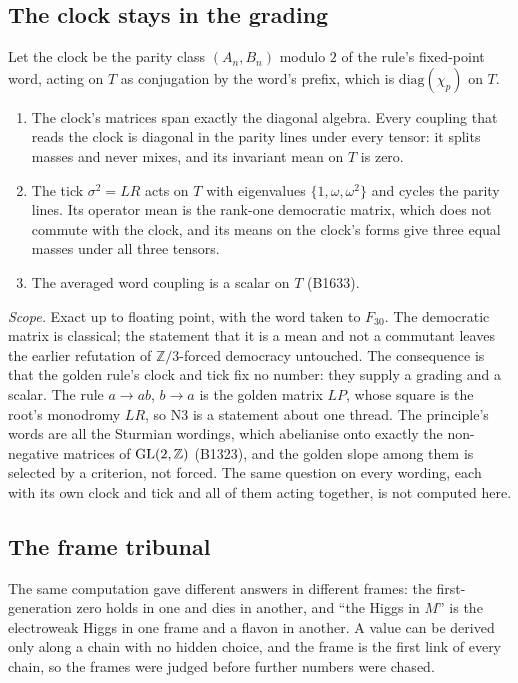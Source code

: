 \subsection{The clock stays in the grading}

\begin{theorem}[N3; B1621, B1633]\label{bd:clock}
Let the clock be the parity class $(A_n,B_n)$ modulo $2$ of the rule's fixed-point word, acting on $T$ as conjugation
by the word's prefix, which is $\mathrm{diag}(\chi_p)$ on $T$.
\begin{enumerate}
\item The clock's matrices span exactly the diagonal algebra. Every coupling that reads the clock is diagonal in the
  parity lines under every tensor: it splits masses and never mixes, and its invariant mean on $T$ is zero.
\item The tick $\sigma^2=LR$ acts on $T$ with eigenvalues $\{1,\omega,\omega^2\}$ and cycles the parity lines. Its
  operator mean is the rank-one democratic matrix, which does not commute with the clock, and its means on the clock's
  forms give three equal masses under all three tensors.
\item The averaged word coupling is a scalar on $T$ (B1633).
\end{enumerate}
\end{theorem}

\emph{Scope.} Exact up to floating point, with the word taken to $F_{30}$. The democratic matrix is classical; the
statement that it is a mean and not a commutant leaves the earlier refutation of $\mathbb Z/3$-forced democracy untouched.
The consequence is that the golden rule's clock and tick fix no number: they supply a grading and a scalar. The rule
$a\to ab$, $b\to a$ is the golden matrix $LP$, whose square is the root's monodromy $LR$, so N3 is a statement about one
thread. The principle's words are all the Sturmian wordings, which abelianise onto exactly the non-negative matrices of
$\mathrm{GL}(2,\mathbb{Z})$ (B1323), and the golden slope among them is selected by a criterion, not forced. The same question on
every wording, each with its own clock and tick and all of them acting together, is not computed here.

\subsection{The frame tribunal}

The same computation gave different answers in different frames: the first-generation zero holds in one and dies in
another, and ``the Higgs in $M$'' is the electroweak Higgs in one frame and a flavon in another. A value can be
derived only along a chain with no hidden choice, and the frame is the first link of every chain, so the frames were
judged before further numbers were chased.

